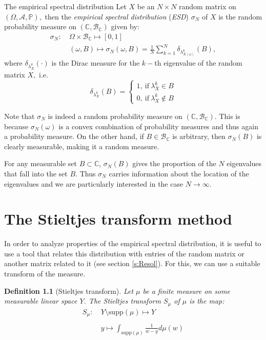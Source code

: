 \documentclass[11pt, a4paper, oneside]{book}
\numberwithin{equation}{chapter}
\newtheorem{definition}{Definition}[section]
\begin{document}
\begin{section}{The empirical spectral distribution} \label{ESD}
Let $X$ be an $N \times N$ random matrix on $(\Omega,\mathcal{A},\mathbb{P}),$ then the \textit{empirical spectral distribution} (\textit{ESD}) $\sigma_N$ of $X$ is the random probability measure on $(\mathbb{C},\mathcal{B}_{\mathbb{C}})$ given by:
%
\begin{align*}
\sigma_N : \ &\Omega \times \mathcal{B}_{\mathbb{C}} \mapsto [0,1] \\
&(\omega,B) \mapsto \sigma_N(\omega,B) = \frac{1}{N} \sum \limits_{k=1}^N \delta_{\lambda_{X(\omega)}^k}(B),
\end{align*}
%
where $\delta_{\lambda_X^k}(\cdot)$ is the Dirac measure for the $k-$th eigenvalue of the random matrix $X,$ i.e.
\[
\delta_{\lambda_X^k}(B) = \begin{cases}
    1 , \ \text{if} \ \lambda_X^k \in B \\
    0 , \ \text{if} \ \lambda_X^k \notin B
\end{cases} 
\]

Note that $\sigma_N$ is indeed a random probability measure on $(\mathbb{C},\mathcal{B}_{\mathbb{C}})$. This is because
$\sigma_N(\omega)$ is a convex combination of probability measures and thus again a probability measure. On the other hand, if $B \in \mathcal{B}_{\mathbb{C}}$ is arbitrary, then $\sigma_N(B)$ is clearly measurable, making it a random measure.

For any measurable set $B\subset \mathbb{C}$, $\sigma_N(B)$ gives the proportion of the $N$ eigenvalues that fall into the set $B.$ Thus $\sigma_N$ carries information about the location of the eigenvalues and we are particularly interested in the case $N \to \infty.$

\end{section}
\chapter{The Stieltjes transform method}

In order to analyze properties of the empirical spectral distribution, it is useful to use a tool that relates this distribution with entries of the random matrix or another matrix related to it (see section \ref{s:Resol}). For this, we can use a suitable transform of the measure.

\begin{definition}[Stieltjes transform]
Let $\mu$ be a finite measure on some measurable linear space $Y$. The Stieltjes transform $S_\mu$ of $\mu$ is the map:
\begin{align*}
S_\mu : \ &Y \setminus \mathrm{supp}(\mu) \mapsto Y \\ \\
&y \mapsto \int_{\mathrm{supp}{(\mu)}} \frac{1}{w-y} d\mu(w)
\end{align*}
\end{definition}
\end{document}
